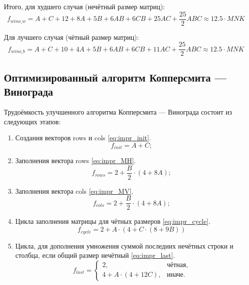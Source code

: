 Итого, для худшего случая (нечётный размер матриц):
\begin{equation}
    \label{eq:bad}
    f_{wino\_w} = A + C + 12 + 8A + 5B + 6AB + 6CB + 25AC + \frac{25}{2}ABC \approx 12.5 \cdot MNK
\end{equation}

Для лучшего случая (чётный размер матриц):
\begin{equation}
    \label{eq:good}
    f_{wino\_b} = A + C + 10 + 4A + 5B + 6AB + 6CB + 11AC + \frac{25}{2}ABC \approx 12.5 \cdot MNK
\end{equation}

\subsection{Оптимизированный алгоритм Копперсмита — Винограда}

Трудоёмкость улучшенного алгоритма Копперсмита — Винограда состоит из следующих этапов:
\begin{enumerate}
    \item Создания векторов rows и cols \eqref{eq:impr_init}.
    \begin{equation}
        \label{eq:impr_init}
        f_{init} = A + C;
    \end{equation}

    \item Заполнения вектора rows \eqref{eq:impr_MH}.
    \begin{equation}
        \label{eq:impr_MH}
        f_{rows} = 2 + \frac{B}{2} \cdot (4 + 8A);
    \end{equation}

    \item Заполнения вектора cols \eqref{eq:impr_MV}.
    \begin{equation}
        \label{eq:impr_MV}
        f_{cols} = 2 + \frac{B}{2} \cdot (4 + 8A);
    \end{equation}

    \item Цикла заполнения матрицы для чётных размеров \eqref{eq:impr_cycle}.
    \begin{equation}
        \label{eq:impr_cycle}
        f_{cycle} = 2 + A \cdot (4 + C \cdot (8 + 9B))
    \end{equation}

    \item Цикла, для дополнения умножения суммой последних нечётных строки и столбца, если общий размер нечётный \eqref{eq:impr_last}.
    \begin{equation}
        \label{eq:impr_last}
        f_{last} =
        \begin{cases}
            2, & \text{чётная,}\\
            4 + A \cdot (4 + 12C), & \text{иначе.}
        \end{cases}
    \end{equation}
\end{enumerate}

